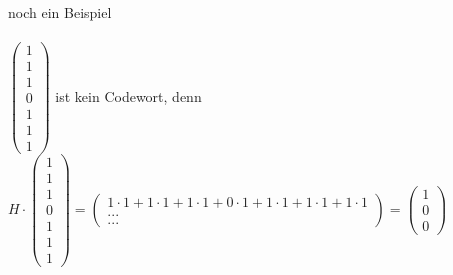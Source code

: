 \documentclass{scrartcl}
\begin{document}
	\\
	\\
	\\
	noch ein Beispiel
	\\
	\\
	$
	\begin{pmatrix}
		1 \\ 1 \\ 1 \\ 0 \\ 1 \\ 1 \\ 1
	\end{pmatrix}
	$
	ist kein Codewort, denn 
	$H \cdot
	\begin{pmatrix}
		1 \\ 1 \\ 1 \\ 0 \\ 1 \\ 1 \\ 1
	\end{pmatrix}
	=
	\begin{pmatrix}
		1 \cdot 1 + 1 \cdot 1 + 1 \cdot 1 + 0 \cdot 1 + 1 \cdot 1 + 1 \cdot 1 + 1 \cdot 1
		\\
		...
		\\
		...
	\end{pmatrix}
	=
	\begin{pmatrix}
		1 \\ 0 \\ 0
	\end{pmatrix}
	$
\end{document}
